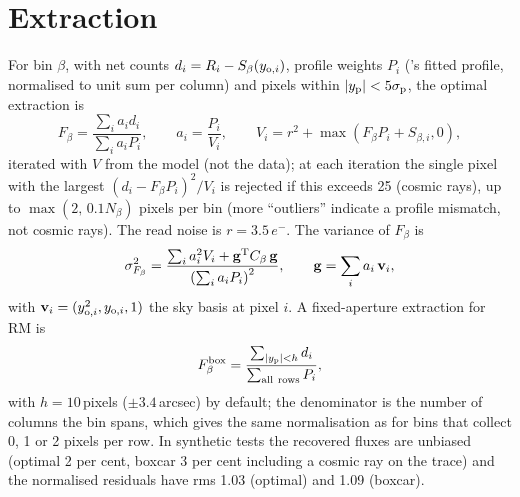 \section{Extraction}
\label{sec:extraction}
For bin $\beta$, with net counts $d_i=R_i-S_\beta(y_{{\rm o},i})$, profile weights $P_i$ (\banzai's fitted profile,
normalised to unit sum per column) and pixels within $|y_{\rm p}|<5\sigma_{\rm p}$, the optimal extraction
\citep{Horne1986} is
\begin{equation}
F_\beta=\frac{\sum_i a_i d_i}{\sum_i a_i P_i},\qquad a_i=\frac{P_i}{V_i},\qquad
V_i = r^2+\max(F_\beta P_i+S_{\beta,i},0),
\label{eq:horne}
\end{equation}
iterated with $V$ from the model (not the data); at each iteration the single pixel with the largest
$(d_i-F_\beta P_i)^2/V_i$ is rejected if this exceeds 25 (cosmic rays), up to $\max(2,\,0.1N_\beta)$ pixels per bin
(more ``outliers'' indicate a profile mismatch, not cosmic rays). The read noise is $r=3.5\,e^-$. The variance of $F_\beta$ is
\begin{equation}
\sigma^2_{F_\beta}=\frac{\sum_i a_i^2V_i+\mathbf{g}^{\rm T}C_\beta\,\mathbf{g}}{\left(\sum_i a_iP_i\right)^2},\qquad
\mathbf{g}=\sum_i a_i\,\mathbf{v}_i,
\label{eq:hornevar}
\end{equation}
with $\mathbf{v}_i=(y_{{\rm o},i}^2,y_{{\rm o},i},1)$ the sky basis at pixel $i$. A fixed-aperture extraction for RM is
\begin{equation}
F^{\rm box}_\beta=\frac{\sum_{|y_{\rm p}|<h}d_i}{\sum_{\rm all\ rows}P_i},
\label{eq:boxcarext}
\end{equation}
with $h=10$\,pixels ($\pm3.4$\,arcsec) by default; the denominator is the number of columns the bin spans, which
gives the same normalisation as \banzai{} for bins that collect 0, 1 or 2 pixels per row. In synthetic tests the
recovered fluxes are unbiased (optimal 2 per cent, boxcar 3 per cent including a cosmic ray on the trace) and the
normalised residuals have rms 1.03 (optimal) and 1.09 (boxcar).

